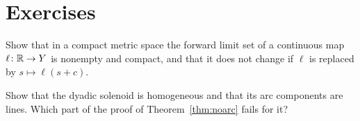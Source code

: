 \section*{Exercises}

\begin{exercise}
Show that in a compact metric space the forward limit set of a continuous map $\ell\colon\mathbb{R}\to Y$ is nonempty and compact, and that it does not
change if $\ell$ is replaced by $s\mapsto\ell(s+c)$.
\end{exercise}

\begin{exercise}
Show that the dyadic solenoid is homogeneous and that its arc components are lines. Which part of the proof of Theorem~\ref{thm:noarc} fails for
it?
\end{exercise}
